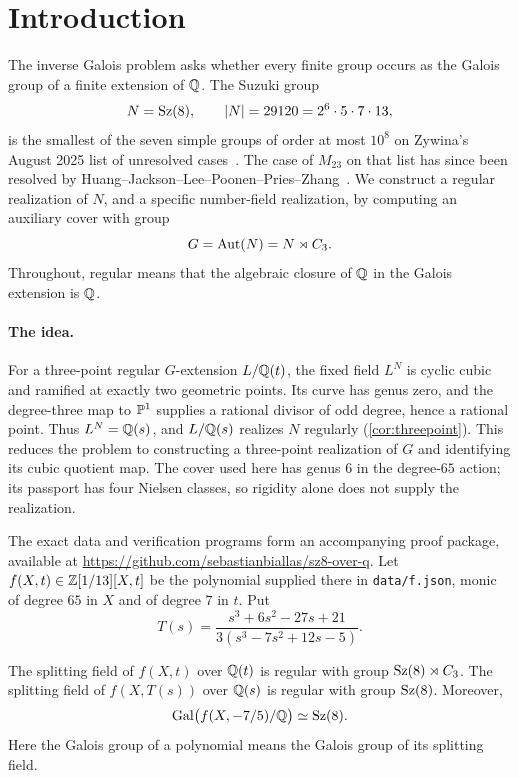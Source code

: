 \section{Introduction}\label{sec:intro}

The inverse Galois problem asks whether every finite group occurs as the
Galois group of a finite extension of $\mathbb{Q}$. The Suzuki group
\[
 N=\operatorname{Sz}(8),\qquad |N|=29120=2^6\cdot5\cdot7\cdot13,
\]
is the smallest of the seven simple groups of order at most $10^8$ on
Zywina's August 2025 list of unresolved cases~\cite{Zywina2025}.
The case of $M_{23}$ on that list has since been resolved by
Huang--Jackson--Lee--Poonen--Pries--Zhang~\cite{HuangEtAl2026}.
We construct a regular realization of $N$, and a specific number-field
realization, by computing an auxiliary cover with group
\[
 G=\operatorname{Aut}(N)=N\rtimes C_3.
\]
Throughout, regular means that the algebraic closure of $\mathbb{Q}$ in the Galois
extension is $\mathbb{Q}$.

\paragraph{The idea.}
For a three-point regular $G$-extension $L/\mathbb{Q}(t)$, the fixed field
$L^N$ is cyclic cubic and ramified at exactly two geometric points.
Its curve has genus zero, and the degree-three map to $\mathbb{P}^1$ supplies
a rational divisor of odd degree, hence a rational point. Thus
$L^N=\mathbb{Q}(s)$, and $L/\mathbb{Q}(s)$ realizes $N$ regularly
(\cref{cor:threepoint}). This reduces the problem to constructing a
three-point realization of $G$ and identifying its cubic quotient map.
The cover used here has genus $6$ in the degree-$65$ action; its passport
has four Nielsen classes, so rigidity alone does not supply the realization.

The exact data and verification programs form an accompanying proof package,
available at \url{https://github.com/sebastianbiallas/sz8-over-q}.
Let $f(X,t)\in\mathbb{Z}[1/13][X,t]$ be the polynomial supplied there in
\texttt{data/f.json}, monic of degree $65$ in $X$ and of degree $7$ in $t$.
Put
\begin{equation}\label{eq:basechange}
 T(s)=\frac{s^3+6s^2-27s+21}{3(s^3-7s^2+12s-5)}.
\end{equation}

\begin{theorem}\label{thm:main}
The splitting field of $f(X,t)$ over $\mathbb{Q}(t)$ is regular with group
$\operatorname{Sz}(8)\rtimes C_3$. The splitting field of $f(X,T(s))$ over $\mathbb{Q}(s)$ is
regular with group $\operatorname{Sz}(8)$. Moreover,
\[
 \operatorname{Gal}\bigl(f(X,-7/5)/\mathbb{Q}\bigr)\simeq\operatorname{Sz}(8).
\]
Here the Galois group of a polynomial means the Galois group of its
splitting field.
\end{theorem}

